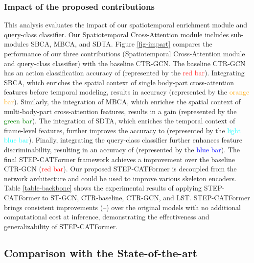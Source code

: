 \documentclass{bmvc2k}
\begin{document}
\subsubsection*{Impact of the proposed contributions}
This analysis evaluates the impact of our spatiotemporal enrichment module and query-class classifier. Our Spatiotemporal Cross-Attention module includes sub-modules SBCA, MBCA, and SDTA. Figure \ref{fig-impart} compares the performance of our three contributions (Spatiotemporal Cross-Attention module and query-class classifier) with the baseline CTR-GCN. The baseline CTR-GCN has an action classification accuracy of  (represented by the \textcolor{red}{red bar}). Integrating SBCA, which enriches the spatial context of single body-part cross-attention features before temporal modeling, results in  accuracy (represented by the \textcolor{orange}{orange bar}). Similarly, the integration of MBCA, which enriches the spatial context of multi-body-part cross-attention features, results in a  gain (represented by the \textcolor{green}{green bar}). The integration of SDTA, which enriches the temporal context of frame-level features, further improves the accuracy to  (represented by the \textcolor{cyan}{light blue bar}). Finally, integrating the query-class classifier further enhances feature discriminability, resulting in an accuracy of  (represented by the \textcolor{blue}{blue bar}). The final STEP-CATFormer framework achieves a  improvement over the baseline CTR-GCN (\textcolor{red}{red bar}). Our proposed STEP-CATFormer is decoupled from the network architecture and could be used to improve various skeleton encoders. Table \ref{table-backbone} shows the experimental results of applying STEP-CATFormer to ST-GCN, CTR-baseline, CTR-GCN, and LST. STEP-CATFormer brings consistent improvements (--) over the original models with no additional computational cost at inference, demonstrating the effectiveness and generalizability of STEP-CATFormer.




\subsection{Comparison with the State-of-the-art}
\end{document}
